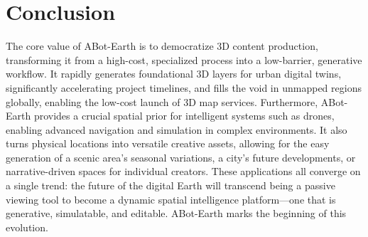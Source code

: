 \documentclass{llmxive}
\begin{document}



























\section{Conclusion}
\label{sec:conclusion}


The core value of ABot-Earth is to democratize 3D content production, transforming it from a high-cost, specialized process into a low-barrier, generative workflow. It rapidly generates foundational 3D layers for urban digital twins, significantly accelerating project timelines, and fills the void in unmapped regions globally, enabling the low-cost launch of 3D map services. Furthermore, ABot-Earth provides a crucial spatial prior for intelligent systems such as drones, enabling advanced navigation and simulation in complex environments. It also turns physical locations into versatile creative assets, allowing for the easy generation of a scenic area's seasonal variations, a city's future developments, or narrative-driven spaces for individual creators. These applications all converge on a single trend: the future of the digital Earth will transcend being a passive viewing tool to become a dynamic spatial intelligence platform—one that is generative, simulatable, and editable. ABot-Earth marks the beginning of this evolution.
\end{document}

